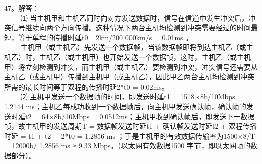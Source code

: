 47。解答： \\
$\qquad$ ⑴ 当主机甲和主机乙同时向对方发送数据时，信号在信道中发生冲突后，冲突信号继续向两个方向传播。这种情况下两台主机均检测到冲突需要经过的时间最短，等于单程的传播时延t0= 2km/200 000km/s =
0.01ms 。 \\
$\qquad$ 主机甲（或主机乙）先发送一个数据帧，当该数据帧即将到达主机乙（或主机乙）时，主机乙（或主机甲）也开始发送一个数据帧，这时，主机乙（或主机甲）将立刻检测到冲突，而主机甲（或主机乙）要检测到冲突，冲突信号还需要从主机乙（或主机甲）传播到主机甲（或主机乙），因此甲乙两台主机均检测到冲突所需的最长时间等于双程的传播时延2*t0 = 0.02ms。 \\
$\qquad$ ⑵ 主机甲发送一个数据帧的时间，即发送时延t1 = 1518×8b/10Mbps = 1.2144 ms；主机乙每成功收到一个数据帧后，向主机甲发送确认帧，确认帧的发送时延t2 = 64×8b/10Mbps = 0.0512ms；主机甲收到确认帧后，即发送下一数据帧，故主机甲的发送周期T = 数据帧发送时延t1 + 确认帧发送时延t2 + 双程传播时延 = t1 + t2 + 2*t0 = 1.2856 ms ；于是主机甲的有效数据传输率为1500×8/T = 12000b/ 1.2856 ms ≈ 9.33 Mbps。（以太网有效数据1500 字节，即以太网帧的数据部分）。